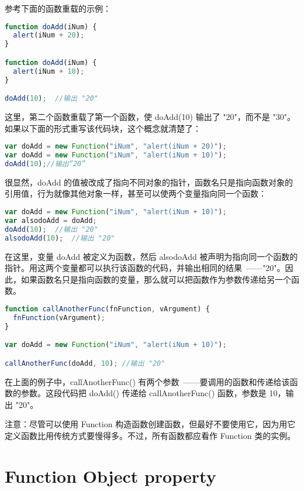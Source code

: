 参考下面的函数重载的示例：



\begin{lstlisting}[language=JavaScript]
function doAdd(iNum) {
  alert(iNum + 20);
}

function doAdd(iNum) {
  alert(iNum + 10);
}

doAdd(10);	//输出 "20"
\end{lstlisting}

这里，第二个函数重载了第一个函数，使 doAdd(10) 输出了 "20"，而不是 "30"。如果以下面的形式重写该代码块，这个概念就清楚了：


\begin{lstlisting}[language=JavaScript]
var doAdd = new Function("iNum", "alert(iNum + 20)");
var doAdd = new Function("iNum", "alert(iNum + 10)");
doAdd(10);//输出“20”
\end{lstlisting}

很显然，doAdd 的值被改成了指向不同对象的指针，函数名只是指向函数对象的引用值，行为就像其他对象一样，甚至可以使两个变量指向同一个函数：



\begin{lstlisting}[language=JavaScript]
var doAdd = new Function("iNum", "alert(iNum + 10)");
var alsodoAdd = doAdd;
doAdd(10);	//输出 "20"
alsodoAdd(10);	//输出 "20"
\end{lstlisting}

在这里，变量 doAdd 被定义为函数，然后 alsodoAdd 被声明为指向同一个函数的指针。用这两个变量都可以执行该函数的代码，并输出相同的结果~——"20"。因此，如果函数名只是指向函数的变量，那么就可以把函数作为参数传递给另一个函数。


\begin{lstlisting}[language=JavaScript]
function callAnotherFunc(fnFunction, vArgument) {
  fnFunction(vArgument);
}

var doAdd = new Function("iNum", "alert(iNum + 10)");

callAnotherFunc(doAdd, 10);	//输出 "20"
\end{lstlisting}

在上面的例子中，callAnotherFunc() 有两个参数~——要调用的函数和传递给该函数的参数。这段代码把 doAdd() 传递给 callAnotherFunc() 函数，参数是 10，输出 "20"。

注意：尽管可以使用 Function 构造函数创建函数，但最好不要使用它，因为用它定义函数比用传统方式要慢得多。不过，所有函数都应看作 Function 类的实例。


\section{Function Object property}

